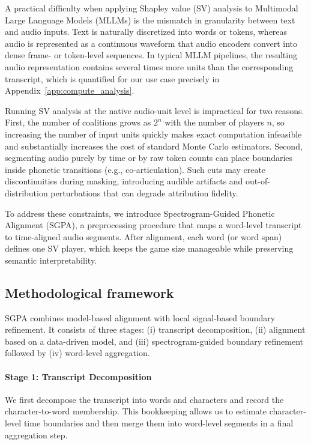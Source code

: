 A practical difficulty when applying Shapley value (SV) analysis to Multimodal Large Language Models (MLLMs) is the mismatch in granularity between text and audio inputs. Text is naturally discretized into words or tokens, whereas audio is represented as a continuous waveform that audio encoders convert into dense frame- or token-level sequences. In typical MLLM pipelines, the resulting audio representation contains several times more units than the corresponding transcript, which is quantified for our use case precisely in Appendix~\ref{app:compute_analysis}.

Running SV analysis at the native audio-unit level is impractical for two reasons. First, the number of coalitions grows as $2^n$ with the number of players $n$, so increasing the number of input units quickly makes exact computation infeasible and substantially increases the cost of standard Monte Carlo estimators. Second, segmenting audio purely by time or by raw token counts can place boundaries inside phonetic transitions (e.g., co-articulation). Such cuts may create discontinuities during masking, introducing audible artifacts and out-of-distribution perturbations that can degrade attribution fidelity.

To address these constraints, we introduce Spectrogram-Guided Phonetic Alignment (SGPA), a preprocessing procedure that maps a word-level transcript to time-aligned audio segments. After alignment, each word (or word span) defines one SV player, which keeps the game size manageable while preserving semantic interpretability.

\subsection{Methodological framework}

SGPA combines model-based alignment with local signal-based boundary refinement. It consists of three stages: (i) transcript decomposition, (ii) alignment based on a data-driven model, and (iii) spectrogram-guided boundary refinement followed by (iv) word-level aggregation.

\paragraph{Stage 1: Transcript Decomposition}
We first decompose the transcript into words and characters and record the character-to-word membership. This bookkeeping allows us to estimate character-level time boundaries and then merge them into word-level segments in a final aggregation step.

